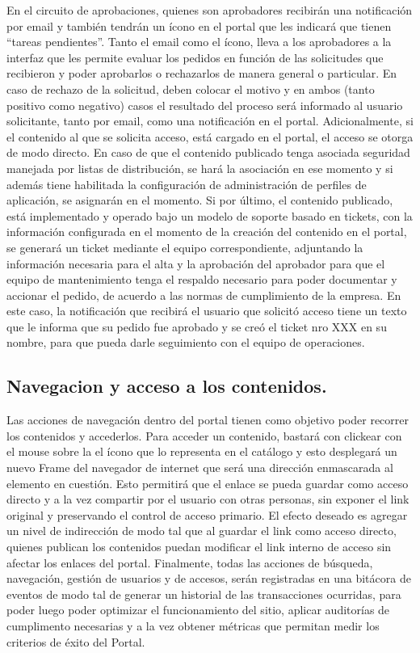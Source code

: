 En el circuito de aprobaciones, quienes son aprobadores recibirán una notificación por email y también tendrán un ícono en el portal que les indicará que tienen “tareas pendientes”. Tanto el email como el ícono, lleva a los aprobadores a la interfaz que les permite evaluar los pedidos en función de las solicitudes que recibieron y poder aprobarlos o rechazarlos de manera general o particular. En caso de rechazo de la solicitud, deben colocar el motivo y en ambos (tanto positivo como negativo) casos el resultado del proceso será informado al usuario solicitante, tanto por email, como una notificación en el portal.
	Adicionalmente, si el contenido al que se solicita acceso, está cargado en el portal, el acceso se otorga de modo directo.
	En caso de que el contenido publicado tenga asociada seguridad manejada por listas de distribución, se hará la asociación en ese momento y si además tiene habilitada la configuración de administración de perfiles de aplicación, se asignarán en el momento.
	Si por último, el contenido publicado, está implementado y operado bajo un modelo de soporte basado en tickets, con la información configurada en el momento de la creación del contenido en el portal, se generará un ticket mediante el equipo correspondiente, adjuntando la información necesaria para el alta y la aprobación del aprobador para que el equipo de mantenimiento tenga el respaldo necesario para poder documentar y accionar el pedido, de acuerdo a las normas de cumplimiento de la empresa. En este caso, la notificación que recibirá el usuario que solicitó acceso tiene un texto que le informa que su pedido fue aprobado y se creó el ticket nro XXX en su nombre, para que pueda darle seguimiento con el equipo de operaciones.


\subsection{Navegacion y acceso a los contenidos.}
\label{usecases:contentaccess}

Las acciones de navegación dentro del portal tienen como objetivo poder recorrer los contenidos y accederlos. Para acceder un contenido, bastará con clickear con el mouse sobre la el ícono que lo representa en el catálogo y esto desplegará un nuevo Frame del navegador de internet que será una dirección enmascarada al elemento en cuestión. Esto permitirá que el enlace se pueda guardar como acceso directo y a la vez compartir por el usuario con otras personas, sin exponer el link original y preservando el control de acceso primario. El efecto deseado es agregar un nivel de indirección de modo tal que al guardar el link como acceso directo, quienes publican los contenidos puedan modificar el link interno de acceso sin afectar los enlaces del portal.
	Finalmente, todas las acciones de búsqueda, navegación, gestión de usuarios y de accesos, serán registradas en una bitácora de eventos de modo tal de generar un historial de las transacciones ocurridas, para poder luego poder optimizar el funcionamiento del sitio, aplicar auditorías de cumplimento necesarias y a la vez obtener métricas que permitan medir los criterios de éxito del Portal.	

